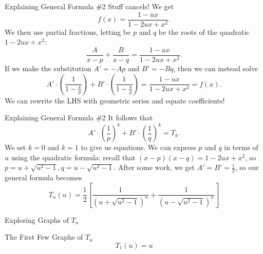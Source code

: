 \documentclass{beamer}
\begin{document}
\begin{frame}{Explaining General Formula \#2}
Stuff cancels! We get
$$f(x) = \frac{1-ux}{1 - 2ux + x^2}.$$
We then use partial fractions, letting be $p$ and $q$ be the roots of the quadratic $1 - 2ux + x^2$:
$$\dfrac{A}{x-p} + \dfrac{B}{x-q} = \dfrac{1 - ux}{1 - 2ux + x^2}.$$
If we make the substitution $A' = -Ap$ and $B' = -Bq$, then we can instead solve
$$A'\cdot \left( \dfrac{1}{1 - \frac{x}{p}} \right)+ B' \cdot \left( \dfrac{1}{1- \frac{x}{q}} \right) = \dfrac{1 - ux}{1 - 2ux + x^2} = f(x).$$
We can rewrite the LHS with geometric series and equate coefficients!
\end{frame}

\begin{frame}{Explaining General Formula \#2}
It follows that
$$A' \cdot \left( \frac{1}{p} \right)^k + B' \cdot \left( \frac{1}{q} \right)^k = T_k.$$
We set $k = 0$ and $k = 1$ to give us equations. We can express $p$ and $q$ in terms of $u$ using the quadratic formula: recall that $(x-p)(x-q) = 1 - 2ux + x^2$, so $p = u + \sqrt{u^2 - 1}, q = u - \sqrt{u^2 - 1}$. After some work, we get $A' = B' = \frac{1}{2}$, so our general formula becomes
$$T_{n}(u) = \frac{1}{2} \left[ \frac{1}{(u+\sqrt{u^{2}-1})^{n}} + \frac{1}{(u-\sqrt{u^{2}-1})^{n}} \right]$$

\end{frame}

\begin{frame}{Exploring Graphs of $T_n$}
 \vspace{-12pt}
\end{frame}

\begin{frame}{The First Few Graphs of $T_n$}
 \vspace{-12pt}
 \[T_1(u)=u\]
\end{frame}
\end{document}
